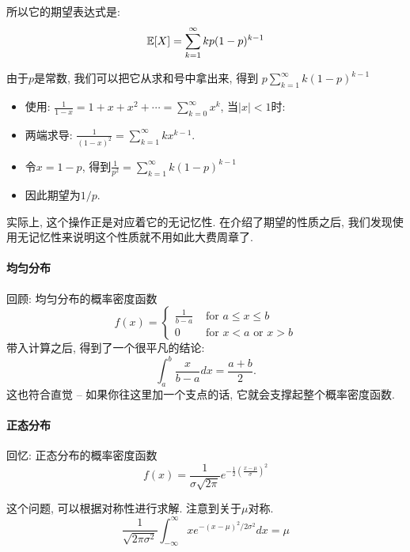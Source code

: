     所以它的期望表达式是: 
    $$
    \mathbb E[X]=\sum_{k=1}^{\infty} k p(1-p)^{k-1}
    $$

    由于$p$是常数, 我们可以把它从求和号中拿出来, 得到
    $p \sum_{k=1}^{\infty} k(1-p)^{k-1}$


\begin{itemize}
    \item 使用: $\frac{1}{1-x}  =1+x+x^2+\cdots =\sum_{k=0}^{\infty} x^k$, 当$|x|<1$时: 
    \item 两端求导: $\frac{1}{(1-x)^2}=\sum_{k=1}^{\infty} k x^{k-1}$.
    \item 令$x=1-p$, 得到$\frac{1}{p^2}=\sum_{k=1}^{\infty} k(1-p)^{k-1}$
    \item 因此期望为$1/p$.
\end{itemize}

实际上, 这个操作正是对应着它的无记忆性. 在介绍了期望的性质之后, 我们发现使用无记忆性来说明这个性质就不用如此大费周章了. 

\paragraph{均匀分布} 回顾: 均匀分布的概率密度函数$$
f(x)= \begin{cases}\frac{1}{b-a} & \text { for } a \leq x \leq b \\ 0 & \text { for } x<a \text { or } x>b\end{cases}
$$
带入计算之后, 得到了一个很平凡的结论: $$\int_a^b \frac{x}{b-a} d x=\frac{a+b}{2}.$$
这也符合直觉 -- 如果你往这里加一个支点的话, 它就会支撑起整个概率密度函数. 

\paragraph{正态分布}
回忆: 正态分布的概率密度函数$$
    f(x)=\frac{1}{\sigma \sqrt{2 \pi}} e^{-\frac{1}{2}\left(\frac{x-\mu}{\sigma}\right)^2}
    $$

    这个问题, 可以根据对称性进行求解. 注意到关于$\mu$对称.  
    $$
\frac{1}{\sqrt{2 \pi \sigma^2}} \int_{-\infty}^{\infty} x e^{-(x-\mu)^2 / 2 \sigma^2} d x=\mu
$$



